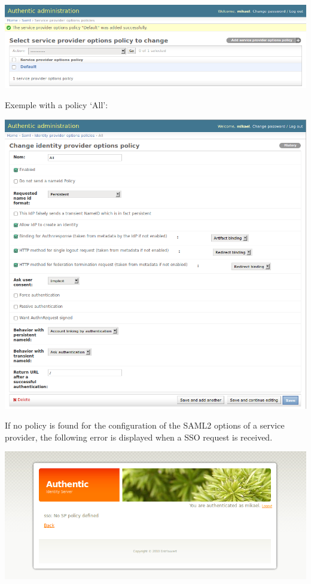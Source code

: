 \documentclass[letterpaper,10pt,english]{sphinxmanual}
\begin{document}
\includegraphics{sp_options_default_saved.png}

Exemple with a policy `All':

\includegraphics{sp_options_all.png}

If no policy is found for the configuration of the SAML2 options of a service
provider, the following error is displayed when a SSO request is received.

\includegraphics{error_no_sp_options.png}
\end{document}
